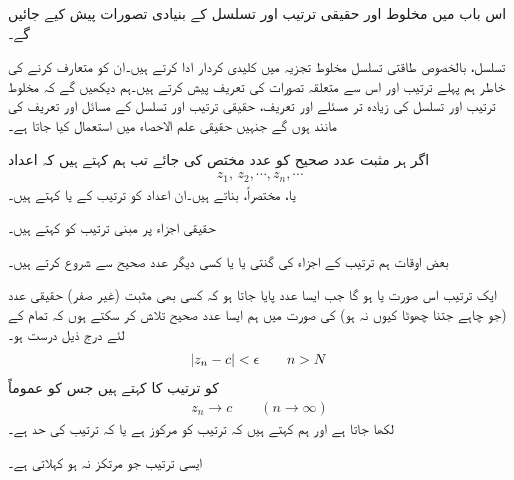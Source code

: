اس باب میں مخلوط اور حقیقی ترتیب اور تسلسل کے بنیادی تصورات پیش کیے جائیں گے۔

تسلسل، بالخصوص طاقتی تسلسل مخلوط تجزیہ میں کلیدی کردار ادا کرتے ہیں۔ان کو متعارف کرنے کی خاطر ہم پہلے ترتیب اور اس سے متعلقہ تصورات کی تعریف پیش کرتے ہیں۔ہم دیکھیں گے کہ مخلوط  ترتیب اور تسلسل کی زیادہ تر مسئلے اور تعریف، حقیقی ترتیب اور تسلسل کے مسائل اور تعریف کی مانند ہوں گے جنہیں حقیقی علم الاحصاء میں استعمال کیا جاتا ہے۔

اگر ہر مثبت عدد صحیح  کو عدد  مختص کی جائے تب  ہم کہتے ہیں کہ اعداد
\begin{align*}
z_1,\,z_2,\cdots,z_n,\cdots
\end{align*} 
 یا،  مختصراً،  بناتے ہیں۔ان  اعداد  کو ترتیب کے  یا   کہتے ہیں۔

حقیقی اجزاء پر مبنی ترتیب کو  کہتے ہیں۔

بعض اوقات ہم ترتیب کے اجزاء کی گنتی  یا  یا کسی دیگر عدد صحیح سے شروع کرتے ہیں۔

ایک ترتیب  اس صورت   یا  ہو گا جب ایسا عدد  پایا جاتا ہو کہ کسی بھی مثبت  (غیر صفر) حقیقی عدد  (جو چاہے جتنا چھوٹا کیوں نہ ہو) کی صورت میں ہم ایسا عدد صحیح  تلاش کر سکتے ہوں کہ  تمام  کے لئے درج ذیل درست ہو۔
\begin{align}\label{مساوات_ترتیب_حد_الف}
\abs{z_n-c}<\epsilon \quad \quad  n>N
\end{align}
 کو ترتیب کا  کہتے ہیں جس کو عموماً
\begin{align*}
z_n\to c\quad\quad (n\to \infty)
\end{align*}
لکھا جاتا ہے اور ہم کہتے ہیں کہ ترتیب  کو مرکوز ہے یا کہ ترتیب کی حد  ہے۔

ایسی ترتیب جو مرتکز نہ ہو  کہلاتی ہے۔

